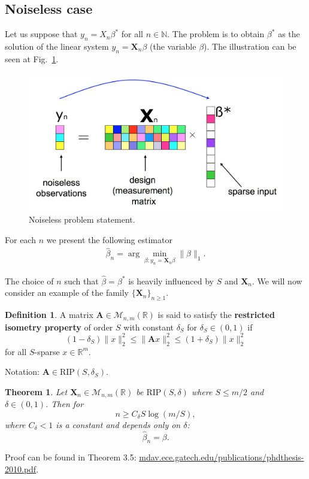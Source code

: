 \documentclass[11pt]{article}
\numberwithin{equation}{section}
\newtheorem{theorem}{Theorem}[section]
\theoremstyle{definition}
\newtheorem{definition}{Definition}[section]
\begin{document}
\subsection{Noiseless case}
Let us suppose that $y_n = X_n \beta^*$ for all $n \in \mathbb N$.
The problem is to obtain $\beta^*$ as the solution of the linear system $y_n = \mathbf X_n \beta$ (the variable $\beta$).
The illustration can be seen at Fig.~\ref{fig:NoiseLessProblemStatement}.
\begin{figure}[H]
    \begin{center}
        \includegraphics[width=.75\textwidth]{figures/problem_statement_2.pdf}
    \end{center}
    \caption{
        \label{fig:NoiseLessProblemStatement}
        Noiseless problem statement.
    }
\end{figure}

For each $n$ we present the following estimator
\begin{gather}
    \label{eq:noiselessBeta}
    \hat \beta_n = \arg \min_{\beta: y_n = \mathbf X_n \beta} \|\beta\|_1.
\end{gather}

The choice of $n$ such that $\hat \beta = \beta^*$ is heavily influenced by $S$ and $\mathbf X_n$.
We will now consider an example of the family $\{\mathbf X_n\}_{n \geqslant 1}$.

\begin{definition}
    \label{def:rip}
    A matrix $\mathbf A \in \mathcal M_{n, m}(\mathbb R)$ is said to satisfy the \textbf{restricted isometry property} of order $S$ with constant $\delta_S$ for $\delta_S \in (0, 1)$ if
    $$ (1 - \delta_S) \|x\|_2^2 \leqslant \|\mathbf A x\|_2^2 \leqslant (1 + \delta_S) \|x\|_2^2 $$
    for all $S$-sparse $x \in \mathbb R^m$.
    
    Notation: $\mathbf A \in \textrm{RIP}(S, \delta_S)$.
\end{definition}

\begin{theorem}
    Let $\mathbf X_n \in \mathcal M_{n, m} (\mathbb R)$ be $\textrm{RIP}(S, \delta)$ where $S \leq m / 2$ and $\delta \in (0, 1)$. Then for
    $$ n \geqslant C_\delta S \log(m / S), $$
    where $C_\delta < 1$ is a constant and depends only on $\delta$:
    $$ \hat \beta_n = \beta. $$
\end{theorem}
Proof can be found in Theorem 3.5: \url{mdav.ece.gatech.edu/publications/phdthesis-2010.pdf}.
\end{document}
